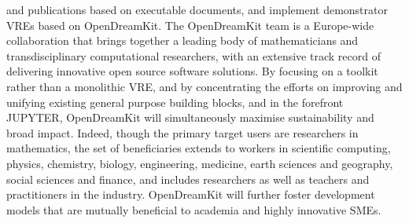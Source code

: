 \documentclass[12pt]{amsbook}
\begin{document}
and publications based on executable documents, and implement demonstrator VREs based on OpenDreamKit.
The OpenDreamKit team is a Europe-wide collaboration that brings together a leading body of mathematicians and transdisciplinary
computational researchers, with an extensive track record of delivering innovative open source software solutions.
By focusing on a toolkit rather than a monolithic VRE, and by concentrating the efforts on improving and unifying existing
general purpose building blocks, and in the forefront JUPYTER, OpenDreamKit will simultaneously maximise sustainability
and broad impact. Indeed, though the primary target users are researchers in mathematics, the set of beneficiaries extends
to workers in scientific computing, physics, chemistry, biology, engineering, medicine, earth sciences and geography, social
sciences and finance, and includes researchers as well as teachers and practitioners in the industry. OpenDreamKit will
further foster development models that are mutually beneficial to academia and highly innovative SMEs.
\end{document}
